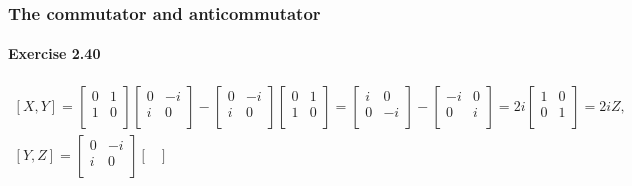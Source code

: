 \documentclass[a4paper,12pt]{article}
\newcommand{\exercise}[1]{\paragraph{Exercise #1}}
\begin{document}
\begin{enumerate}[label=(\roman*)]
    \end{enumerate}

    \subsubsection{The commutator and anticommutator}

    \exercise{2.40}
    \begin{gather}
        \nonumber
        [X, Y] =
        \begin{bmatrix}
            0 & 1\\
            1 & 0\\
        \end{bmatrix}
        \begin{bmatrix}
            0 & -i\\
            i & 0\\
        \end{bmatrix}
        -
        \begin{bmatrix}
            0 & -i\\
            i & 0\\
        \end{bmatrix}
        \begin{bmatrix}
            0 & 1\\
            1 & 0\\
        \end{bmatrix}
        =
        \begin{bmatrix}
            i & 0\\
            0 & -i\\
        \end{bmatrix}
        -
        \begin{bmatrix}
            -i & 0\\
            0 & i\\
        \end{bmatrix}
        =
        2i
        \begin{bmatrix}
            1 & 0\\
            0 & 1\\
        \end{bmatrix}
        = 2i Z \textrm{,} \\
        \nonumber
        [Y, Z] =
        \begin{bmatrix}
            0 & -i\\
            i & 0\\
        \end{bmatrix}
        \begin{bmatrix}

\end{bmatrix}
\end{gather}
\end{document}
